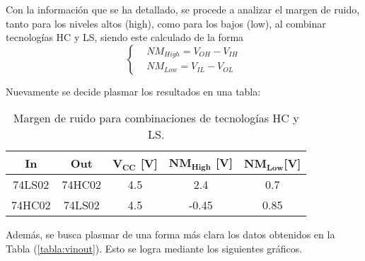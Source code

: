 Con la información que se ha detallado, se procede a analizar el margen de ruido, tanto para los niveles altos (high), como para los bajos (low), al combinar tecnologías HC y LS, siendo este calculado de la forma
\begin{equation*}
\left\{
\begin{aligned}
		& NM_{High}= V_{OH} - V_{IH} \\
		& NM_{Low}= V_{IL} - V_{OL} 
\end{aligned}
\right.
\end{equation*}

Nuevamente se decide plasmar los resultados en una tabla:
\begin{table}[H]
\centering
\begin{tabular}{|c|c|c|c|c|}
\hline
\textbf{In} & \textbf{Out} & $\mathbf{V_{CC}}$ \textbf{[V]} & $\mathbf{NM_{High}}$ \textbf{[V]} & $\mathbf{NM_{Low}} $\textbf{[V]} \\ \hline
74LS02      & 74HC02       & 4.5                            & 2.4                               & 0.7                              \\ 
74HC02      & 74LS02       & 4.5                              & -0.45                               & 0.85                                \\ \hline
\end{tabular}
\caption{Margen de ruido para combinaciones de tecnologías HC y LS.}
\label{tabla:nm}
\end{table}

Además, se busca plasmar de una forma más clara los datos obtenidos en la Tabla (\ref{tabla:vinout}). Esto se logra mediante los siguientes gráficos.  

